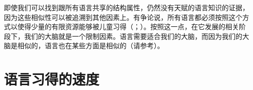 即使我们可以找到跟所有语言共享的结构属性，仍然没有天赋的语言知识的证据，因为这些相似性可以被追溯到其他因素上。有争论说，所有语言都必须按照这个方式以使得少量的有限资源能够被儿童习得（\citealp[\S~10.7.2]{Hurford2002a}；\citealp[]{Behrens2009a}）。按照这一点，在它发展的相关阶段下，我们的大脑就是一个限制因素。语言需要适合我们的大脑，而因为我们的大脑是相似的，语言也在某些方面是相似的（请参考\citealp[]{Kluender92a}）。

\section{语言习得的速度}
\label{Abschnitt-Geschwindigkeit-Spracherwerb}

